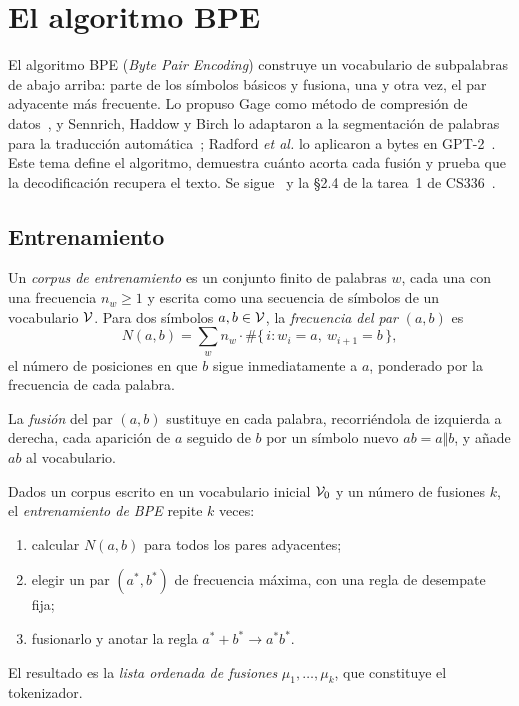 \chapter{El algoritmo BPE}
\label{tema:2}

El algoritmo BPE (\emph{Byte Pair Encoding}) construye un vocabulario de subpalabras de abajo arriba: parte de los símbolos básicos y fusiona, una y otra vez, el par adyacente más frecuente. Lo propuso Gage como método de compresión de datos~\cite{gage}, y Sennrich, Haddow y Birch lo adaptaron a la segmentación de palabras para la traducción automática~\cite[§3.2]{sennrich}; Radford \emph{et al.} lo aplicaron a bytes en GPT-2~\cite[§2.2]{gpt2}. Este tema define el algoritmo, demuestra cuánto acorta cada fusión y prueba que la decodificación recupera el texto. Se sigue~\cite[§2.4]{jm3} y la §2.4 de la tarea~1 de CS336~\cite{cs336}.

\section{Entrenamiento}

\begin{definicion}\label{def:corpus-bpe}
Un \emph{corpus de entrenamiento} es un conjunto finito de palabras $w$, cada una con una frecuencia $n_w\ge 1$ y escrita como una secuencia de símbolos de un vocabulario $\mathcal{V}$. Para dos símbolos $a,b\in\mathcal{V}$, la \emph{frecuencia del par} $(a,b)$ es
\[
N(a,b)=\sum_{w}n_w\cdot\#\{\,i : w_i=a,\ w_{i+1}=b\,\},
\]
el número de posiciones en que $b$ sigue inmediatamente a $a$, ponderado por la frecuencia de cada palabra.
\end{definicion}

\begin{definicion}[Fusión]
La \emph{fusión} del par $(a,b)$ sustituye en cada palabra, recorriéndola de izquierda a derecha, cada aparición de $a$ seguido de $b$ por un símbolo nuevo $ab=a\Vert b$, y añade $ab$ al vocabulario.
\end{definicion}

\begin{definicion}\label{def:bpe}
Dados un corpus escrito en un vocabulario inicial $\mathcal{V}_0$ y un número de fusiones $k$, el \emph{entrenamiento de BPE} repite $k$ veces:
\begin{enumerate}[label=\arabic*.]
  \item calcular $N(a,b)$ para todos los pares adyacentes;
  \item elegir un par $(a^{*},b^{*})$ de frecuencia máxima, con una regla de desempate fija;
  \item fusionarlo y anotar la regla $a^{*}+b^{*}\to a^{*}b^{*}$.
\end{enumerate}
El resultado es la \emph{lista ordenada de fusiones} $\mu_1,\dots,\mu_k$, que constituye el tokenizador.
\end{definicion}


